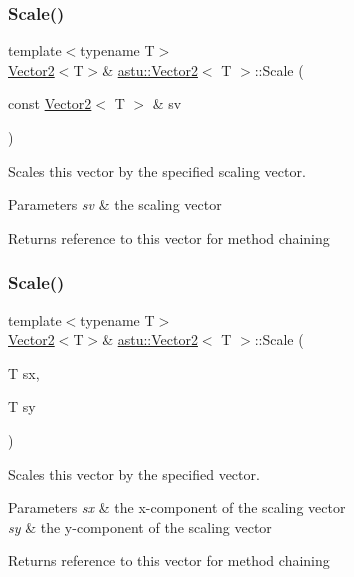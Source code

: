 \subsubsection{\texorpdfstring{Scale()}{Scale()}\hspace{0.1cm}{\footnotesize\ttfamily [1/2]}}
{\footnotesize\ttfamily template$<$typename T$>$ \\
\hyperlink{classastu_1_1Vector2}{Vector2}$<$T$>$\& \hyperlink{classastu_1_1Vector2}{astu\+::\+Vector2}$<$ T $>$\+::Scale (\begin{DoxyParamCaption}\item[{const \hyperlink{classastu_1_1Vector2}{Vector2}$<$ T $>$ \&}]{sv }\end{DoxyParamCaption})\hspace{0.3cm}{\ttfamily [inline]}}

Scales this vector by the specified scaling vector.


\begin{DoxyParams}{Parameters}
{\em sv} & the scaling vector \\
\hline
\end{DoxyParams}
\begin{DoxyReturn}{Returns}
reference to this vector for method chaining 
\end{DoxyReturn}
\mbox{\label{classastu_1_1Vector2_a32500c8d1ebd2b516a6b83f807857d98}} 
\subsubsection{\texorpdfstring{Scale()}{Scale()}\hspace{0.1cm}{\footnotesize\ttfamily [2/2]}}
{\footnotesize\ttfamily template$<$typename T$>$ \\
\hyperlink{classastu_1_1Vector2}{Vector2}$<$T$>$\& \hyperlink{classastu_1_1Vector2}{astu\+::\+Vector2}$<$ T $>$\+::Scale (\begin{DoxyParamCaption}\item[{T}]{sx,  }\item[{T}]{sy }\end{DoxyParamCaption})\hspace{0.3cm}{\ttfamily [inline]}}

Scales this vector by the specified vector.


\begin{DoxyParams}{Parameters}
{\em sx} & the x-\/component of the scaling vector \\
\hline
{\em sy} & the y-\/component of the scaling vector \\
\hline
\end{DoxyParams}
\begin{DoxyReturn}{Returns}
reference to this vector for method chaining 
\end{DoxyReturn}
\mbox{\label{classastu_1_1Vector2_a303494be2ce5f334571f6f284ad13e28}} 
